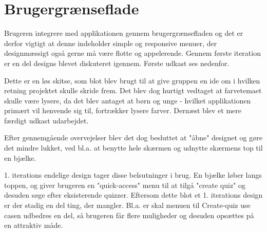 \chapter{Brugergrænseflade}
Brugeren integrere med applikationen gennem brugergrænsefladen og det er derfor vigtigt at denne indeholder simple og responsive menuer, der designmæssigt også gerne må være flotte og appelerende.  
Gennem første iteration er en del designs blevet diskuteret igennem. Første udkast ses nedenfor. \\


Dette er en løs skitse, som blot blev brugt til at give gruppen en ide om i hvilken retning projektet skulle skride frem. Det blev dog hurtigt vedtaget at farvetemaet skulle være lysere, da det blev antaget at børn og unge - hvilket applikationen primært vil henvende sig til, fortrækker lysere farver.
Dernæst blev et mere færdigt udkast udarbejdet.\\ 



Efter gennemgående overvejelser blev det dog besluttet at "åbne" designet og gøre det mindre lukket, ved bl.a. at benytte hele skærmen og udnytte skærmens top til en bjælke. \\



1. iterations endelige design tager disse belsutninger i brug. En bjælke løber langs toppen, og giver brugeren en "quick-access" menu til at tilgå "create quiz" og desuden søge efter eksisterende quizzer. 
Eftersom dette blot et 1. iterations design er der stadig en del ting, der mangler. Bl.a. er skal menuen til Create-quiz use casen udbedres en del, så brugeren får flere muligheder og desuden opsættes på en attraktiv måde. 
